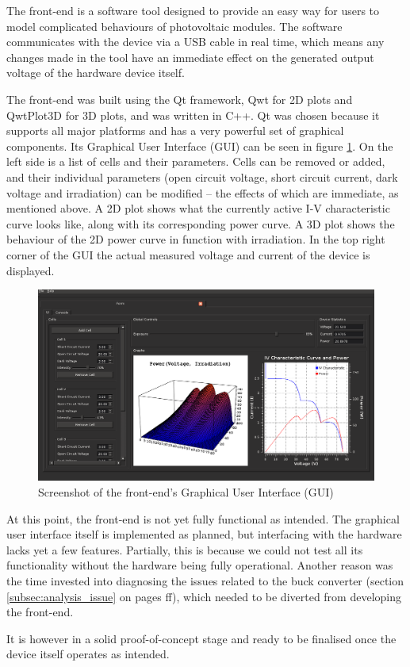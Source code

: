 The  front-end  is  a software  tool  designed  to  provide  an easy  way  for
users to  model complicated  behaviours of photovoltaic  modules. The software
communicates with  the device via  a USB cable in  real time, which  means any
changes made  in the  tool have  an immediate effect  on the  generated output
voltage of the hardware device itself.

The front-end was built using the Qt framework\cite{ref:qt}, Qwt\cite{ref:qwt}
for 2D plots  and QwtPlot3D\cite{ref:qwtplot3d} for 3D plots,  and was written
in C++.  Qt was chosen because it  supports all major platforms and has a very
powerful set of  graphical components. Its Graphical User  Interface (GUI) can
be seen in  figure \ref{fig:front-end:screenshot}. On the left side  is a list
of  cells and  their  parameters. Cells can  be removed  or  added, and  their
individual  parameters  (open circuit  voltage,  short  circuit current,  dark
voltage  and  irradiation)  can  be  modified --  the  effects  of  which  are
immediate, as mentioned  above. A 2D plot shows what the  currently active I-V
characteristic curve looks like, along  with its corresponding power curve.  A
3D  plot  shows  the  behaviour  of  the  2D  power  curve  in  function  with
irradiation. In the  top right corner of  the GUI the actual  measured voltage
and current of the device is displayed.

\begin{figure}[th!]
    \centering
    \includegraphics[width=.8\textwidth]{images/frontend/frontend.png}
    \caption{Screenshot of the front-end's Graphical User Interface (GUI)}
    \label{fig:front-end:screenshot}
\end{figure}

At this  point, the  front-end is  not yet  fully functional  as intended. The
graphical user  interface itself  is implemented  as planned,  but interfacing
with the  hardware lacks  yet a  few features. Partially,  this is  because we
could  not  test  all  its  functionality without  the  hardware  being  fully
operational. Another  reason  was  the   time  invested  into  diagnosing  the
issues related  to the buck converter  (section \ref{subsec:analysis_issue} on
pages  \pageref{subsec:analysis_issue}ff), which  needed to  be diverted  from
developing the front-end.

It is however in a solid proof-of-concept stage and ready to be finalised once
the device itself operates as intended.
